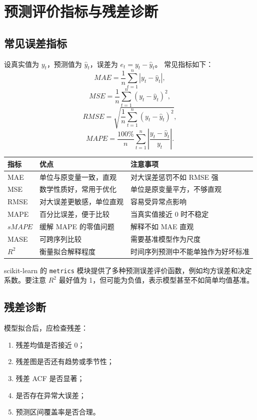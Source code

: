 \documentclass[11pt,a4paper]{ctexart}
\begin{document}
\section{预测评价指标与残差诊断}
\subsection{常见误差指标}
设真实值为 $y_t$，预测值为 $\hat y_t$，误差为 $e_t=y_t-\hat y_t$。
常见指标如下：
\[
MAE=\frac1n\sum_{t=1}^n |y_t-\hat y_t|,
\]
\[
MSE=\frac1n\sum_{t=1}^n (y_t-\hat y_t)^2,
\]
\[
RMSE=\sqrt{\frac1n\sum_{t=1}^n (y_t-\hat y_t)^2},
\]
\[
MAPE=\frac{100\%}{n}\sum_{t=1}^n \left|\frac{y_t-\hat y_t}{y_t}\right|.
\]

\begin{longtable}{p{2.6cm}p{4.8cm}p{5.8cm}}
\toprule
指标 & 优点 & 注意事项 \\
\midrule
MAE & 单位与原变量一致，直观 & 对大误差惩罚不如 RMSE 强 \\
MSE & 数学性质好，常用于优化 & 单位是原变量平方，不够直观 \\
RMSE & 对大误差更敏感，单位直观 & 容易受异常点影响 \\
MAPE & 百分比误差，便于比较 & 当真实值接近 0 时不稳定 \\
$sMAPE$ & 缓解 MAPE 的零值问题 & 解释不如 MAE 直观 \\
MASE & 可跨序列比较 & 需要基准模型作为尺度 \\
$R^2$ & 衡量拟合解释程度 & 时间序列预测中不能单独作为好坏标准 \\
\bottomrule
\end{longtable}

scikit-learn 的 \texttt{metrics} 模块提供了多种预测误差评价函数，例如均方误差和决定系数。要注意 $R^2$ 最好值为 1，但可能为负值，表示模型甚至不如简单均值基准。

\subsection{残差诊断}
模型拟合后，应检查残差：
\begin{enumerate}
  \item 残差均值是否接近 0；
  \item 残差图是否还有趋势或季节性；
  \item 残差 ACF 是否显著；
  \item 是否存在异常大误差；
  \item 预测区间覆盖率是否合理。
\end{enumerate}
\end{document}
